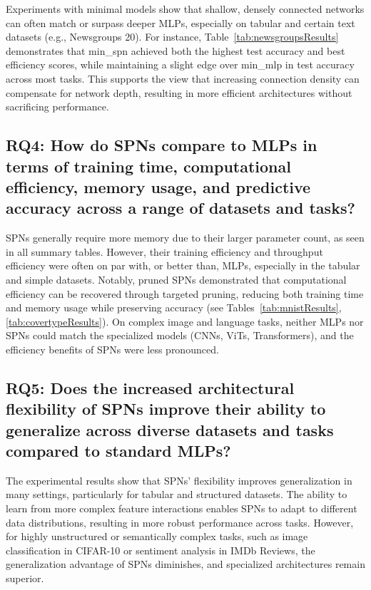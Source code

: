 Experiments with minimal models show that shallow, densely connected networks can often match or surpass deeper MLPs, especially on tabular and certain text datasets (e.g., Newsgroups 20). For instance, Table~\ref{tab:newsgroupsResults} demonstrates that min\_spn achieved both the highest test accuracy and best efficiency scores, while maintaining a slight edge over min\_mlp in test accuracy across most tasks. This supports the view that increasing connection density can compensate for network depth, resulting in more efficient architectures without sacrificing performance.

\subsection*{RQ4: How do SPNs compare to MLPs in terms of training time, computational efficiency, memory usage, and predictive accuracy across a range of datasets and tasks?}

SPNs generally require more memory due to their larger parameter count, as seen in all summary tables. However, their training efficiency and throughput efficiency were often on par with, or better than, MLPs, especially in the tabular and simple datasets. Notably, pruned SPNs demonstrated that computational efficiency can be recovered through targeted pruning, reducing both training time and memory usage while preserving accuracy (see Tables~\ref{tab:mnistResults}, \ref{tab:covertypeResults}). On complex image and language tasks, neither MLPs nor SPNs could match the specialized models (CNNs, ViTs, Transformers), and the efficiency benefits of SPNs were less pronounced.

\subsection*{RQ5: Does the increased architectural flexibility of SPNs improve their ability to generalize across diverse datasets and tasks compared to standard MLPs?}

The experimental results show that SPNs' flexibility improves generalization in many settings, particularly for tabular and structured datasets. The ability to learn from more complex feature interactions enables SPNs to adapt to different data distributions, resulting in more robust performance across tasks. However, for highly unstructured or semantically complex tasks, such as image classification in CIFAR-10 or sentiment analysis in IMDb Reviews, the generalization advantage of SPNs diminishes, and specialized architectures remain superior.

